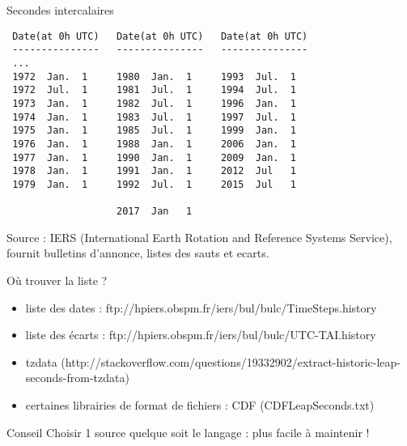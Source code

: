 \documentclass[]{beamer}
\begin{document}
\begin{frame}[fragile]{Secondes intercalaires}
    \footnotesize{
        \begin{verbatim}
 Date(at 0h UTC)   Date(at 0h UTC)   Date(at 0h UTC)
 ---------------   ---------------   ---------------
 ...
 1972  Jan.  1     1980  Jan.  1     1993  Jul.  1
 1972  Jul.  1     1981  Jul.  1     1994  Jul.  1
 1973  Jan.  1     1982  Jul.  1     1996  Jan.  1
 1974  Jan.  1     1983  Jul.  1     1997  Jul.  1
 1975  Jan.  1     1985  Jul.  1     1999  Jan.  1
 1976  Jan.  1     1988  Jan.  1     2006  Jan.  1
 1977  Jan.  1     1990  Jan.  1     2009  Jan.  1
 1978  Jan.  1     1991  Jan.  1     2012  Jul   1
 1979  Jan.  1     1992  Jul.  1     2015  Jul   1

                   2017  Jan   1
 \end{verbatim}
 }
Source : IERS (International Earth Rotation and Reference
Systems Service), fournit bulletins d'annonce, listes des sauts et ecarts.
\end{frame}

\begin{frame}[fragile]{Où trouver la liste ?}
    \begin{itemize}
        \item liste des dates : ftp://hpiers.obspm.fr/iers/bul/bulc/TimeSteps.history
        \item liste des écarts : ftp://hpiers.obspm.fr/iers/bul/bulc/UTC-TAI.history
        \item tzdata (http://stackoverflow.com/questions/19332902/extract-historic-leap-seconds-from-tzdata)
        \item certaines librairies de format de fichiers : CDF (CDFLeapSeconds.txt)
    \end{itemize}
    \begin{alertblock}{Conseil}
        Choisir 1 source quelque soit le langage : plus facile à maintenir !
    \end{alertblock}
\end{frame}
\end{document}
